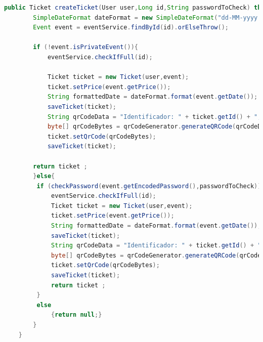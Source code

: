 \begin{lstlisting}[language=Java, caption=Función createTicket, label=lst:servicioTicket]
    public Ticket createTicket(User user,Long id,String passwordToCheck) throws IOException, WriterException {
        SimpleDateFormat dateFormat = new SimpleDateFormat("dd-MM-yyyy HH:mm");
        Event event = eventService.findById(id).orElseThrow();

        if (!event.isPrivateEvent()){
            eventService.checkIfFull(id);

            Ticket ticket = new Ticket(user,event);
            ticket.setPrice(event.getPrice());
            String formattedDate = dateFormat.format(event.getDate());
            saveTicket(ticket);
            String qrCodeData = "Identificador: " + ticket.getId() + ", Nombre del Evento: " + event.getName() + ", Fecha del evento: "+ formattedDate;
            byte[] qrCodeBytes = qrCodeGenerator.generateQRCode(qrCodeData, 200, 200);
            ticket.setQrCode(qrCodeBytes);
            saveTicket(ticket);

        return ticket ;
        }else{
         if (checkPassword(event.getEncodedPassword(),passwordToCheck)){
             eventService.checkIfFull(id);
             Ticket ticket = new Ticket(user,event);
             ticket.setPrice(event.getPrice());
             String formattedDate = dateFormat.format(event.getDate());
             saveTicket(ticket);
             String qrCodeData = "Identificador: " + ticket.getId() + ", Nombre del Evento: " + event.getName() + ", Fecha del evento: "+ formattedDate;
             byte[] qrCodeBytes = qrCodeGenerator.generateQRCode(qrCodeData, 200, 200); // Ajusta el tamaño del QR según tus necesidades
             ticket.setQrCode(qrCodeBytes);
             saveTicket(ticket);
             return ticket ;
         }
         else
             {return null;}
        }
    }
\end{lstlisting}

